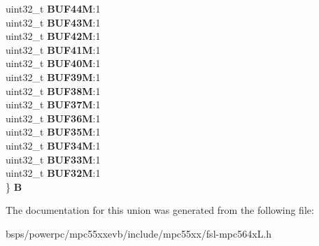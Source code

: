 \begin{DoxyCompactItemize}
\begin{tabbing}
\>uint32\_t {\bfseries BUF44M}:1\\
\>uint32\_t {\bfseries BUF43M}:1\\
\>uint32\_t {\bfseries BUF42M}:1\\
\>uint32\_t {\bfseries BUF41M}:1\\
\>uint32\_t {\bfseries BUF40M}:1\\
\>uint32\_t {\bfseries BUF39M}:1\\
\>uint32\_t {\bfseries BUF38M}:1\\
\>uint32\_t {\bfseries BUF37M}:1\\
\>uint32\_t {\bfseries BUF36M}:1\\
\>uint32\_t {\bfseries BUF35M}:1\\
\>uint32\_t {\bfseries BUF34M}:1\\
\>uint32\_t {\bfseries BUF33M}:1\\
\>uint32\_t {\bfseries BUF32M}:1\\
\} {\bfseries B}\\

\end{tabbing}\end{DoxyCompactItemize}


The documentation for this union was generated from the following file\+:\begin{DoxyCompactItemize}
\item 
bsps/powerpc/mpc55xxevb/include/mpc55xx/fsl-\/mpc564x\+L.\+h\end{DoxyCompactItemize}
